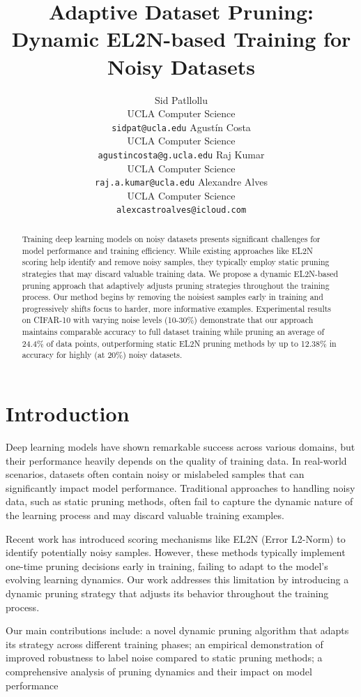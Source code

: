 \documentclass{article}
\author{
  Sid Patllollu\\
  UCLA Computer Science\\
  \texttt{sidpat@ucla.edu} \And
  Agustín Costa\\
  UCLA Computer Science\\
  \texttt{agustincosta@g.ucla.edu} \And
  Raj Kumar\\
  UCLA Computer Science\\
  \texttt{raj.a.kumar@ucla.edu} \And
  Alexandre Alves\\
  UCLA Computer Science\\
  \texttt{alexcastroalves@icloud.com}
}
\title{Adaptive Dataset Pruning: Dynamic EL2N-based Training for Noisy Datasets}
\begin{document}
\maketitle

\begin{abstract}
Training deep learning models on noisy datasets presents significant challenges for model performance and training efficiency. While existing approaches like EL2N scoring help identify and remove noisy samples, they typically employ static pruning strategies that may discard valuable training data. We propose a dynamic EL2N-based pruning approach that adaptively adjusts pruning strategies throughout the training process. Our method begins by removing the noisiest samples early in training and progressively shifts focus to harder, more informative examples. Experimental results on CIFAR-10 with varying noise levels (10-30\%) demonstrate that our approach maintains comparable accuracy to full dataset training while pruning an average of 24.4\% of data points, outperforming static EL2N pruning methods by up to 12.38\% in accuracy for highly (at 20\%) noisy datasets.
\end{abstract}

\section{Introduction}
Deep learning models have shown remarkable success across various domains, but their performance heavily depends on the quality of training data. In real-world scenarios, datasets often contain noisy or mislabeled samples that can significantly impact model performance. Traditional approaches to handling noisy data, such as static pruning methods, often fail to capture the dynamic nature of the learning process and may discard valuable training examples.

Recent work has introduced scoring mechanisms like EL2N (Error L2-Norm) to identify potentially noisy samples. However, these methods typically implement one-time pruning decisions early in training, failing to adapt to the model's evolving learning dynamics. Our work addresses this limitation by introducing a dynamic pruning strategy that adjusts its behavior throughout the training process.

Our main contributions include: a novel dynamic pruning algorithm that adapts its strategy across different training phases; an empirical demonstration of improved robustness to label noise compared to static pruning methods; a comprehensive analysis of pruning dynamics and their impact on model performance
\end{document}
